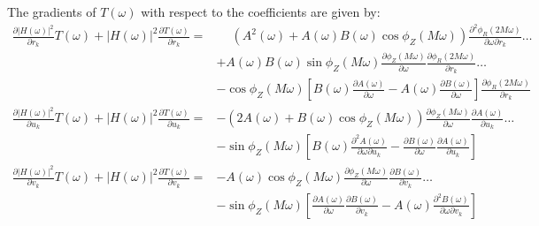 \documentclass[a4paper,twoside,10pt,english]{report}
\begin{document}
The gradients of $T\left(\omega\right)$ with respect to the coefficients are
given by:
\begin{align*}
\frac{\partial\left|H\left(\omega\right)\right|^{2}}{\partial r_{k}}
T\left(\omega\right)+\left|H\left(\omega\right)\right|^{2}
\frac{\partial T\left(\omega\right)}{\partial r_{k}}=
  &\phantom{-}
    \left(A^{2}\left(\omega\right)+A\left(\omega\right)B\left(\omega\right)
 \cos\phi_{Z}\left(M\omega\right)\right)
\frac{\partial^{2}\phi_{R}\left(2M\omega\right)}
     {\partial\omega\partial r_{k}} \hdots \\
&+A\left(\omega\right)B\left(\omega\right)\sin\phi_{Z}\left(M\omega\right)
  \frac{\partial\phi_{Z}\left(M\omega\right)}{\partial\omega}
  \frac{\partial\phi_{R}\left(2M\omega\right)}{\partial r_{k}} \hdots \\
&-\cos\phi_{Z}\left(M\omega\right)\left[
  B\left(\omega\right)\frac{\partial A\left(\omega\right)}{\partial\omega}-
  A\left(\omega\right)\frac{\partial B\left(\omega\right)}{\partial\omega}
  \right]\frac{\partial\phi_{R}\left(2M\omega\right)}{\partial r_{k}}\\
\frac{\partial\left|H\left(\omega\right)\right|^{2}}{\partial u_{k}}
T\left(\omega\right)+\left|H\left(\omega\right)\right|^{2}
\frac{\partial T\left(\omega\right)}{\partial u_{k}}=
&-\left(2A\left(\omega\right)+
  B\left(\omega\right)\cos\phi_{Z}\left(M\omega\right)\right)
  \frac{\partial\phi_{Z}\left(M\omega\right)}{\partial\omega}
  \frac{\partial A\left(\omega\right)}{\partial u_{k}} \hdots \\
&  -\sin\phi_{Z}\left(M\omega\right)\left[
  B\left(\omega\right)\frac{\partial^{2} A\left(\omega\right)}
  {\partial\omega\partial u_{k}} -
  \frac{\partial B\left(\omega\right)}{\partial\omega}
  \frac{\partial A\left(\omega\right)}{\partial u_{k}}\right] \\
\frac{\partial\left|H\left(\omega\right)\right|^{2}}{\partial v_{k}}
T\left(\omega\right)+\left|H\left(\omega\right)\right|^{2}
\frac{\partial T\left(\omega\right)}{\partial v_{k}}=
&-A\left(\omega\right)\cos\phi_{Z}\left(M\omega\right)
  \frac{\partial\phi_{Z}\left(M\omega\right)}{\partial\omega}
  \frac{\partial B\left(\omega\right)}{\partial v_{k}} \hdots \\
&  -\sin\phi_{Z}\left(M\omega\right)\left[
  \frac{\partial A\left(\omega\right)}{\partial\omega}
  \frac{\partial B\left(\omega\right)}{\partial v_{k}}
  -A\left(\omega\right)\frac{\partial^{2} B\left(\omega\right)}
  {\partial\omega\partial v_{k}}
  \right]
\end{align*}
\end{document}
